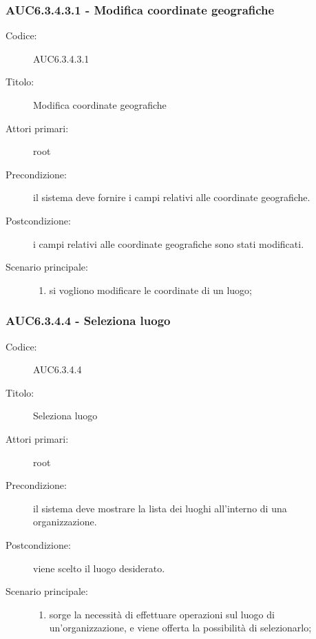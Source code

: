 \documentclass[casi-duso]{subfiles}
\begin{document}
\subsubsection{AUC6.3.4.3.1 - Modifica coordinate geografiche}%
\label{subsub:AUC6.3.4.3.1}
\begin{description}
  \item[Codice:] AUC6.3.4.3.1
  \item[Titolo:] Modifica coordinate geografiche
  \item[Attori primari:] root
  \item[Precondizione:] il sistema deve fornire i campi relativi alle coordinate geografiche.
  \item[Postcondizione:] i campi relativi alle coordinate geografiche sono stati modificati.
  \item[Scenario principale:]
  \begin{enumerate}
    \item si vogliono modificare le coordinate di un luogo;
  \end{enumerate}
\end{description}

\subsubsection{AUC6.3.4.4 - Seleziona luogo}%
\label{subsub:AUC6.3.4.4}
\begin{description}
  \item[Codice:] AUC6.3.4.4
  \item[Titolo:] Seleziona luogo
  \item[Attori primari:] root
  \item[Precondizione:] il sistema deve mostrare la lista dei luoghi all'interno di una organizzazione.
  \item[Postcondizione:] viene scelto il luogo desiderato.
  \item[Scenario principale:]
  \begin{enumerate}
    \item sorge la necessità di effettuare operazioni sul luogo di un'organizzazione, e viene offerta la possibilità di selezionarlo;
  \end{enumerate}
\end{description}
\end{document}
